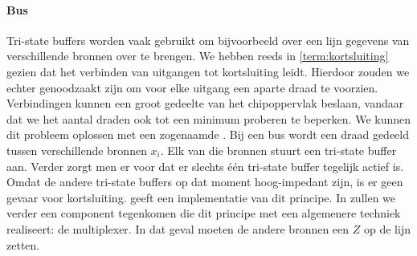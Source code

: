 \paragraph{Bus}Tri-state buffers worden vaak gebruikt om bijvoorbeeld over een lijn gegevens van verschillende bronnen over te brengen. We hebben reeds in \ref{term:kortsluiting} gezien dat het verbinden van uitgangen tot kortsluiting leidt. Hierdoor zouden we echter genoodzaakt zijn om voor elke uitgang een aparte draad te voorzien. Verbindingen kunnen een groot gedeelte van het chipoppervlak beslaan, vandaar dat we het aantal draden ook tot een minimum proberen te beperken. We kunnen dit probleem oplossen met een zogenaamde . Bij een bus wordt een draad gedeeld tussen verschillende bronnen $x_i$. Elk van die bronnen stuurt een tri-state buffer aan. Verder zorgt men er voor dat er slechts \'e\'en tri-state buffer tegelijk actief is. Omdat de andere tri-state buffers op dat moment hoog-impedant zijn, is er geen gevaar voor kortsluiting.  geeft een implementatie van dit principe. In  zullen we verder een component tegenkomen die dit principe met een algemenere techniek realiseert: de multiplexer. In dat geval moeten de andere bronnen een $Z$ op de lijn zetten.
